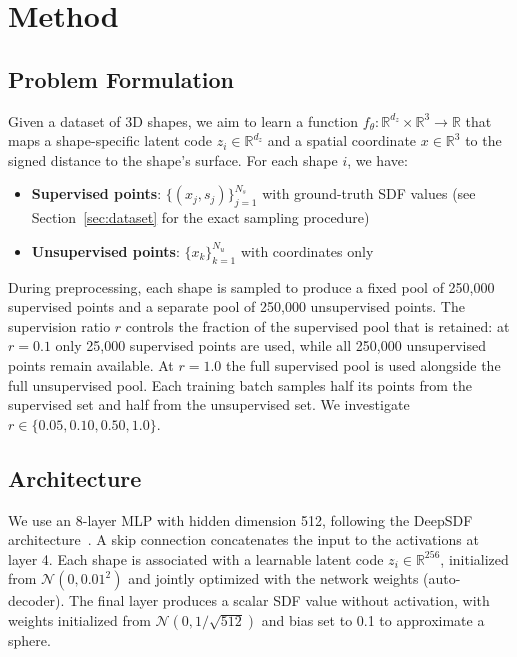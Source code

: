 \documentclass[conference]{IEEEtran}
\begin{document}
\section{Method}

\subsection{Problem Formulation}

Given a dataset of 3D shapes, we aim to learn a function $f_\theta: \mathbb{R}^{d_z} \times \mathbb{R}^3 \to \mathbb{R}$ that maps a shape-specific latent code $z_i \in \mathbb{R}^{d_z}$ and a spatial coordinate $x \in \mathbb{R}^3$ to the signed distance to the shape's surface. For each shape $i$, we have:
\begin{itemize}
    \item \textbf{Supervised points}: $\{(x_j, s_j)\}_{j=1}^{N_s}$ with ground-truth SDF values (see Section~\ref{sec:dataset} for the exact sampling procedure)
    \item \textbf{Unsupervised points}: $\{x_k\}_{k=1}^{N_u}$ with coordinates only
\end{itemize}
During preprocessing, each shape is sampled to produce a fixed pool of 250{,}000 supervised points and a separate pool of 250{,}000 unsupervised points. The supervision ratio $r$ controls the fraction of the supervised pool that is retained: at $r = 0.1$ only 25{,}000 supervised points are used, while all 250{,}000 unsupervised points remain available. At $r = 1.0$ the full supervised pool is used alongside the full unsupervised pool. Each training batch samples half its points from the supervised set and half from the unsupervised set. We investigate $r \in \{0.05, 0.10, 0.50, 1.0\}$.

\subsection{Architecture}

We use an 8-layer MLP with hidden dimension 512, following the DeepSDF architecture~\cite{deepsdf}. A skip connection concatenates the input to the activations at layer 4. Each shape is associated with a learnable latent code $z_i \in \mathbb{R}^{256}$, initialized from $\mathcal{N}(0, 0.01^2)$ and jointly optimized with the network weights (auto-decoder). The final layer produces a scalar SDF value without activation, with weights initialized from $\mathcal{N}(0, 1/\sqrt{512})$ and bias set to 0.1 to approximate a sphere.
\end{document}
